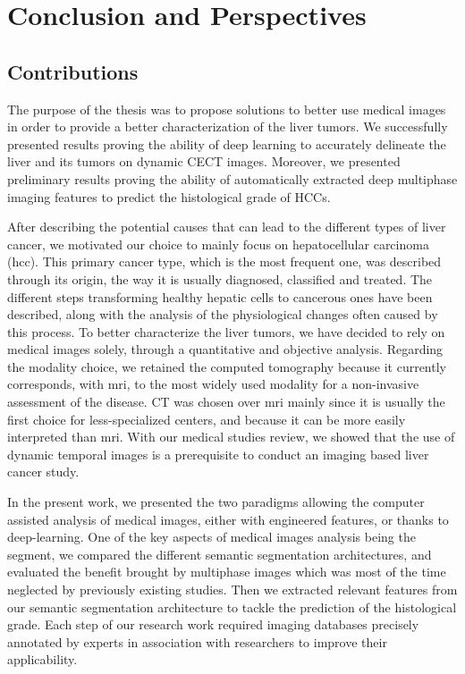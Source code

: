 \chapter*{Conclusion and Perspectives}
\label{cha:Conclusion}

\section*{Contributions}
\label{sec:ConclusionContributions}

The purpose of the thesis was to propose solutions to better use medical images in order to provide a better characterization of the liver tumors. We successfully presented results proving the ability of deep learning to accurately delineate the liver and its tumors on dynamic CECT images. Moreover, we presented preliminary results proving the ability of automatically extracted deep multiphase imaging features to predict the histological grade of HCCs.

After describing the potential causes that can lead to the different
types of liver cancer, we motivated our choice to mainly focus on
hepatocellular carcinoma (\ac{hcc}).
This primary cancer type, which is the most frequent one, was described
through its origin, the way it is usually diagnosed, classified and
treated. The different steps transforming healthy hepatic cells to cancerous ones have been described, along with the analysis of the physiological changes often caused by this process.
To better characterize the liver tumors, we have decided to rely on
medical images solely, through a quantitative and objective analysis.
Regarding the modality choice, we retained the computed tomography
because it currently corresponds, with \ac{mri}, to the most widely used modality  for a non-invasive assessment of the disease.
CT was chosen over \ac{mri} mainly since it is usually the first choice for less-specialized centers, and because it can be more easily interpreted than \ac{mri}. With our medical studies review, we showed that the use of dynamic temporal images is a prerequisite to conduct an imaging based liver cancer study.

In the present work, we presented the two paradigms allowing the computer
assisted analysis of medical images, either with engineered features, or
thanks to deep-learning. One of the key aspects of medical images
analysis being the segment, we compared the different semantic
segmentation architectures, and evaluated the benefit brought by
multiphase images which was most of the time neglected by previously
existing studies. Then we extracted relevant features from our semantic
segmentation architecture to tackle the prediction of the histological
grade. Each step of our research work required imaging databases
precisely annotated by experts in association with researchers to
improve their applicability.

